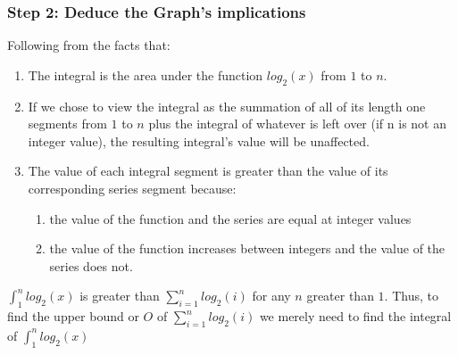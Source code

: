 \documentclass[10pt,a4paper]{article}
\begin{document}
\subsubsection{Step 2: Deduce the Graph's implications}
Following from the facts that:
\begin{enumerate}
  \item The integral is the area under the function $log_2(x)$ from $1$ to $n$.
  \item If we chose to view the integral as the summation of all of its length one segments from $1$ to $n$ plus the integral of whatever is left over (if n is not an integer value), the resulting integral's value will be unaffected.
  \item The value of each integral segment is greater than the value of its corresponding series segment because:
  \begin{enumerate}
    \item the value of the function and the series are equal at integer values
    \item the value of the function increases between integers and the value of the series does not.
  \end{enumerate}
\end{enumerate}
$\int_1^n log_2(x)$ is greater than $\sum_{i = 1}^n log_2(i)$ for any $n$ greater than $1$. Thus, to find the upper bound or $O$ of $\sum_{i = 1}^n log_2(i)$ we merely need to find the integral of $\int_1^n log_2(x)$\\\\
\end{document}
